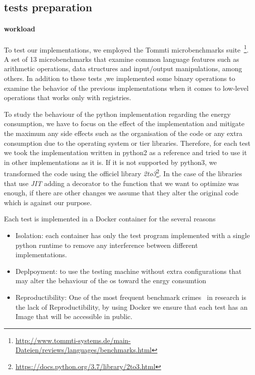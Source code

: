 \subsection{tests preparation}
\paragraph{workload}
To test our implementations, we employed the Tommti microbenchmarks suite~\footnote{\url{http://www.tommti-systems.de/main-Dateien/reviews/languages/benchmarks.html}}. A set of 13 microbenchmarks that examine common language features such as arithmetic operations, data structures and input/output manipulations, among others. In addition to these tests ,we implemented some binary operations to examine the behavior of the previous implementations when it comes to low-level operations that works only with registries.

To study the behaviour of the python implementation regarding the energy consumption, we have to focus on the effect of the implementation and mitigate the maximum any side effects such as the organisation of the code or any extra consumption due to the operating system or tier libraries.
Therefore, for each test we took the implementation written in python2 as a reference and tried to use it in other implementations as it is. If it is not supported by python3, we transformed the code using the officiel library  \emph{2to3}\footnote{\url{https://docs.python.org/3.7/library/2to3.html}}.
In the case of the libraries that use \emph{JIT} adding a decorator to the function that we want to optimize was enough, if there are other changes we assume that they alter the original code which is against our purpose.

Each test is implemented in a Docker container for the several reasons
\begin{itemize}
    \item Isolation: each container has only the test program implemented with a single python runtime to remove any interference between different implementations.
    \item Deplpoyment: to use the testing machine without extra configurations that may alter the behaviour of the os toward the enrgy consumtion
    \item Reproductibility: One of the most frequent benchmark crimes~\cite{DBLP:journals/corr/abs-1801-02381} in research is the lack of Reproductibility, by using Docker we ensure that each test has an Image that will be accessible in public.
\end{itemize}

